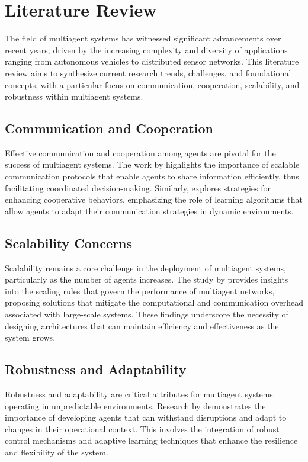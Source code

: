\section{Literature Review}

The field of multiagent systems has witnessed significant advancements over recent years, driven by the increasing complexity and diversity of applications ranging from autonomous vehicles to distributed sensor networks. This literature review aims to synthesize current research trends, challenges, and foundational concepts, with a particular focus on communication, cooperation, scalability, and robustness within multiagent systems.

\subsection{Communication and Cooperation}

Effective communication and cooperation among agents are pivotal for the success of multiagent systems. The work by \cite{scaling_rules_multiagent_networks} highlights the importance of scalable communication protocols that enable agents to share information efficiently, thus facilitating coordinated decision-making. Similarly, \cite{cooperative_ai_communication_multiagents} explores strategies for enhancing cooperative behaviors, emphasizing the role of learning algorithms that allow agents to adapt their communication strategies in dynamic environments.

\subsection{Scalability Concerns}

Scalability remains a core challenge in the deployment of multiagent systems, particularly as the number of agents increases. The study by \cite{scaling_rules_multiagent_networks} provides insights into the scaling rules that govern the performance of multiagent networks, proposing solutions that mitigate the computational and communication overhead associated with large-scale systems. These findings underscore the necessity of designing architectures that can maintain efficiency and effectiveness as the system grows.

\subsection{Robustness and Adaptability}

Robustness and adaptability are critical attributes for multiagent systems operating in unpredictable environments. Research by \cite{cooperative_ai_communication_multiagents} demonstrates the importance of developing agents that can withstand disruptions and adapt to changes in their operational context. This involves the integration of robust control mechanisms and adaptive learning techniques that enhance the resilience and flexibility of the system.

